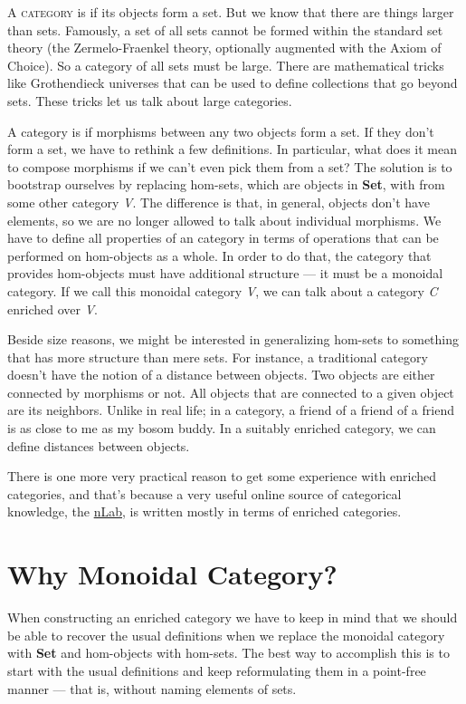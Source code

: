 \lettrine[lhang=0.17]{A}{ category} is  if its objects form a set. But we know that
there are things larger than sets. Famously, a set of all sets cannot be
formed within the standard set theory (the Zermelo-Fraenkel theory,
optionally augmented with the Axiom of Choice). So a category of all
sets must be large. There are mathematical tricks like Grothendieck
universes that can be used to define collections that go beyond sets.
These tricks let us talk about large categories.

A category is  if morphisms between any two objects
form a set. If they don't form a set, we have to rethink a few
definitions. In particular, what does it mean to compose morphisms if we
can't even pick them from a set? The solution is to bootstrap ourselves
by replacing hom-sets, which are objects in \textbf{Set}, with
 from some other category \emph{V}. The difference is
that, in general, objects don't have elements, so we are no longer
allowed to talk about individual morphisms. We have to define all
properties of an  category in terms of operations that
can be performed on hom-objects as a whole. In order to do that, the
category that provides hom-objects must have additional structure --- it
must be a monoidal category. If we call this monoidal category \emph{V},
we can talk about a category \emph{C} enriched over \emph{V}.

Beside size reasons, we might be interested in generalizing hom-sets to
something that has more structure than mere sets. For instance, a
traditional category doesn't have the notion of a distance between
objects. Two objects are either connected by morphisms or not. All
objects that are connected to a given object are its neighbors. Unlike
in real life; in a category, a friend of a friend of a friend is as
close to me as my bosom buddy. In a suitably enriched category, we can
define distances between objects.

There is one more very practical reason to get some experience with
enriched categories, and that's because a very useful online source of
categorical knowledge, the \href{https://ncatlab.org/}{nLab}, is written
mostly in terms of enriched categories.

\section{Why Monoidal Category?}\label{why-monoidal-category}

When constructing an enriched category we have to keep in mind that we
should be able to recover the usual definitions when we replace the
monoidal category with \textbf{Set} and hom-objects with hom-sets. The
best way to accomplish this is to start with the usual definitions and
keep reformulating them in a point-free manner --- that is, without
naming elements of sets.

